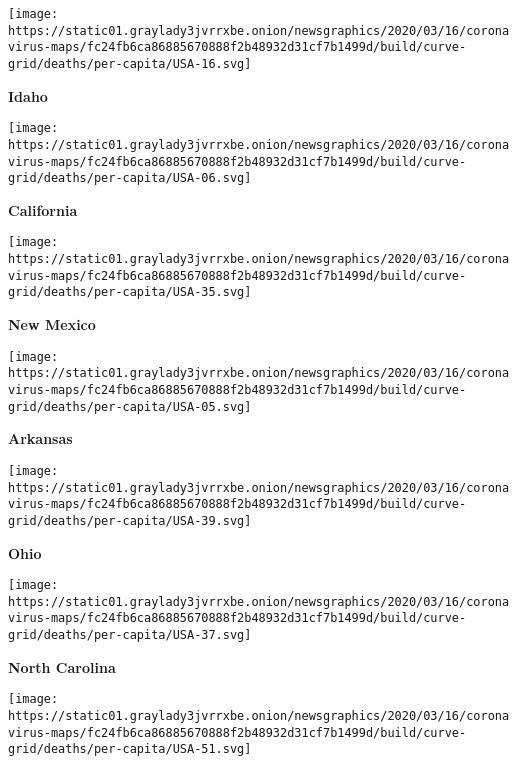 \texttt{[image: https://static01.graylady3jvrrxbe.onion/newsgraphics/2020/03/16/coronavirus-maps/fc24fb6ca86885670888f2b48932d31cf7b1499d/build/curve-grid/deaths/per-capita/USA-16.svg]}

\textbf{Idaho}

\href{https://www.nytimes3xbfgragh.onion/interactive/2020/us/california-coronavirus-cases.html}{}

\texttt{[image: https://static01.graylady3jvrrxbe.onion/newsgraphics/2020/03/16/coronavirus-maps/fc24fb6ca86885670888f2b48932d31cf7b1499d/build/curve-grid/deaths/per-capita/USA-06.svg]}

\textbf{California}

\href{https://www.nytimes3xbfgragh.onion/interactive/2020/us/new-mexico-coronavirus-cases.html}{}

\texttt{[image: https://static01.graylady3jvrrxbe.onion/newsgraphics/2020/03/16/coronavirus-maps/fc24fb6ca86885670888f2b48932d31cf7b1499d/build/curve-grid/deaths/per-capita/USA-35.svg]}

\textbf{New Mexico}

\href{https://www.nytimes3xbfgragh.onion/interactive/2020/us/arkansas-coronavirus-cases.html}{}

\texttt{[image: https://static01.graylady3jvrrxbe.onion/newsgraphics/2020/03/16/coronavirus-maps/fc24fb6ca86885670888f2b48932d31cf7b1499d/build/curve-grid/deaths/per-capita/USA-05.svg]}

\textbf{Arkansas}

\href{https://www.nytimes3xbfgragh.onion/interactive/2020/us/ohio-coronavirus-cases.html}{}

\texttt{[image: https://static01.graylady3jvrrxbe.onion/newsgraphics/2020/03/16/coronavirus-maps/fc24fb6ca86885670888f2b48932d31cf7b1499d/build/curve-grid/deaths/per-capita/USA-39.svg]}

\textbf{Ohio}

\href{https://www.nytimes3xbfgragh.onion/interactive/2020/us/north-carolina-coronavirus-cases.html}{}

\texttt{[image: https://static01.graylady3jvrrxbe.onion/newsgraphics/2020/03/16/coronavirus-maps/fc24fb6ca86885670888f2b48932d31cf7b1499d/build/curve-grid/deaths/per-capita/USA-37.svg]}

\textbf{North Carolina}

\href{https://www.nytimes3xbfgragh.onion/interactive/2020/us/virginia-coronavirus-cases.html}{}

\texttt{[image: https://static01.graylady3jvrrxbe.onion/newsgraphics/2020/03/16/coronavirus-maps/fc24fb6ca86885670888f2b48932d31cf7b1499d/build/curve-grid/deaths/per-capita/USA-51.svg]}


